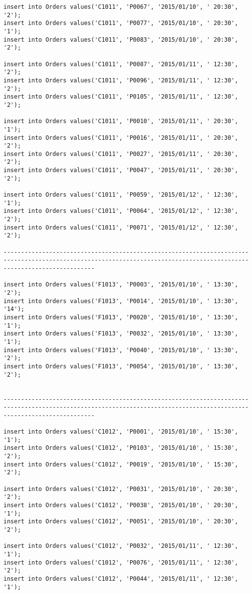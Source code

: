 \documentclass[a4,12pt]{report}
\begin{document}
\begin{lstlisting}
insert into Orders values('C1011', 'P0067', '2015/01/10', ' 20:30', '2');
insert into Orders values('C1011', 'P0077', '2015/01/10', ' 20:30', '1');
insert into Orders values('C1011', 'P0083', '2015/01/10', ' 20:30', '2');

insert into Orders values('C1011', 'P0087', '2015/01/11', ' 12:30', '2');
insert into Orders values('C1011', 'P0096', '2015/01/11', ' 12:30', '2');
insert into Orders values('C1011', 'P0105', '2015/01/11', ' 12:30', '2');

insert into Orders values('C1011', 'P0010', '2015/01/11', ' 20:30', '1');
insert into Orders values('C1011', 'P0016', '2015/01/11', ' 20:30', '2');
insert into Orders values('C1011', 'P0027', '2015/01/11', ' 20:30', '2');
insert into Orders values('C1011', 'P0047', '2015/01/11', ' 20:30', '2');

insert into Orders values('C1011', 'P0059', '2015/01/12', ' 12:30', '1');
insert into Orders values('C1011', 'P0064', '2015/01/12', ' 12:30', '2');
insert into Orders values('C1011', 'P0071', '2015/01/12', ' 12:30', '2');

----------------------------------------------------------------------------------------------------------------------------------------------------------------------

insert into Orders values('F1013', 'P0003', '2015/01/10', ' 13:30', '2');
insert into Orders values('F1013', 'P0014', '2015/01/10', ' 13:30', '14');
insert into Orders values('F1013', 'P0020', '2015/01/10', ' 13:30', '1');
insert into Orders values('F1013', 'P0032', '2015/01/10', ' 13:30', '1');
insert into Orders values('F1013', 'P0040', '2015/01/10', ' 13:30', '2');
insert into Orders values('F1013', 'P0054', '2015/01/10', ' 13:30', '2');


----------------------------------------------------------------------------------------------------------------------------------------------------------------------

insert into Orders values('C1012', 'P0001', '2015/01/10', ' 15:30', '1');
insert into Orders values('C1012', 'P0103', '2015/01/10', ' 15:30', '2');
insert into Orders values('C1012', 'P0019', '2015/01/10', ' 15:30', '2');

insert into Orders values('C1012', 'P0031', '2015/01/10', ' 20:30', '2');
insert into Orders values('C1012', 'P0038', '2015/01/10', ' 20:30', '1');
insert into Orders values('C1012', 'P0051', '2015/01/10', ' 20:30', '2');

insert into Orders values('C1012', 'P0032', '2015/01/11', ' 12:30', '1');
insert into Orders values('C1012', 'P0076', '2015/01/11', ' 12:30', '2');
insert into Orders values('C1012', 'P0044', '2015/01/11', ' 12:30', '1');


\end{lstlisting}
\end{document}
